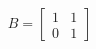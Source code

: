 \documentclass[preview]{standalone}
\begin{document}
\begin{align*}
B = \begin{bmatrix} 1 & 1 \\ 0 & 1 \end{bmatrix}
\end{align*}
\end{document}
